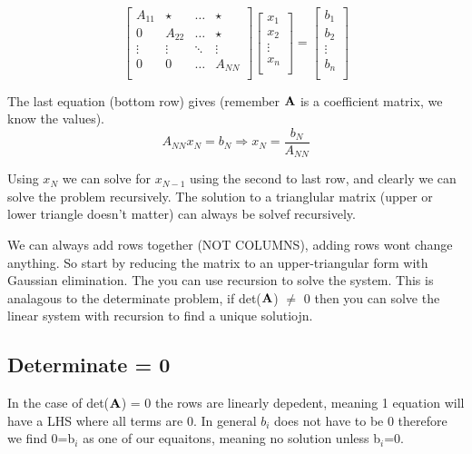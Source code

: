 \documentclass{article}
\newcommand{\be}{\begin{equation}}
\newcommand{\ee}{\end{equation}}
\newcommand{\bA}{\mbox{\bf A}}
\begin{document}
\be
\begin{bmatrix}
    A_{11}  &   \star   & \dots &  \star\\
    0       &   A_{22}       & \dots     &   \star\\
\vdots  &  \vdots   &   \ddots  &   \vdots\\
    0       &   0       & \dots     &   A_{NN}\\
\end{bmatrix}
\begin{bmatrix}
x_1     \\
x_2     \\
\vdots  \\
x_n     \\
\end{bmatrix}
=
\begin{bmatrix}
b_1     \\
b_2     \\
\vdots  \\
b_n     \\
\end{bmatrix}
\ee

The last equation (bottom row) gives (remember $\bA$ is a coefficient matrix, we know the values).
\be
A_{NN}x_N=b_N \Rightarrow x_N = \frac{b_N}{A_{NN}}
\ee

Using $x_N$ we can solve for $x_{N-1}$ using the second to last row, and clearly we can solve the problem recursively.
The solution to a trianglular matrix (upper or lower triangle doesn't matter) can always be solvef recursively.

We can always add rows together (NOT COLUMNS), adding rows wont change anything.
So start by reducing the matrix to an upper-triangular form with Gaussian elimination.
The you can use recursion to solve the system.
This is analagous to the determinate problem, if det($\bA$) $\neq$ 0 then you can solve the linear system with recursion to find a unique solutiojn.

\subsection{Determinate = 0}
In the case of det($\bA$) = 0 the rows are linearly depedent, meaning 1 equation will have a LHS where all terms are 0.
In general $b_i$ does not have to be 0 therefore we find 0=b$_i$ as one of our equaitons, meaning no solution unless b$_i$=0.
\end{document}
